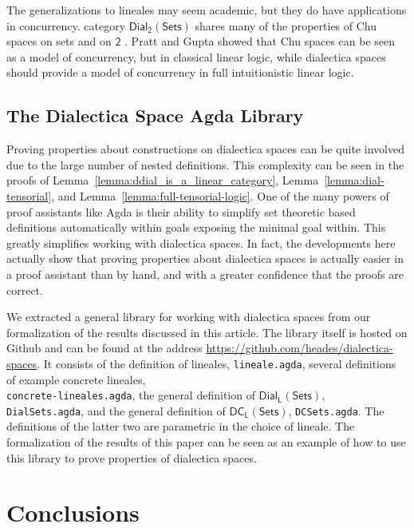 \documentclass[preprint,12pt]{elsarticle}
\newcommand{\dial}[0]{\mathsf{Dial_2}(\mathsf{Sets})}
\newcommand{\dialSets}[1]{\mathsf{Dial_{#1}}(\mathsf{Sets})}
\newcommand{\dcSets}[1]{\mathsf{DC_{#1}}(\mathsf{Sets})}
\begin{document}
The generalizations to lineales may seem academic, but they do have
applications in concurrency.  %
category $\dial$ shares many of the properties of Chu spaces on sets
and on $\mathsf{2}$ \cite{dePaiva:2007}.  Pratt and Gupta
\cite{Gupta:1994} showed that Chu spaces can be seen as a model of
concurrency, but in classical linear logic, while dialectica spaces
should provide a model of concurrency in full intuitionistic linear
logic.

\subsection{The Dialectica Space Agda Library}
\label{subsec:the_dialectica_space_agda_library}
Proving properties about constructions on dialectica spaces can be
quite involved due to the large number of nested definitions.  This
complexity can be seen in the proofs of
Lemma~\ref{lemma:ddial_is_a_linear_category},
Lemma~\ref{lemma:dial-tensorial}, and
Lemma~\ref{lemma:full-tensorial-logic}.  One of the many powers of
proof assistants like Agda is their ability to simplify set theoretic
based definitions automatically within goals exposing the minimal goal
within.  This greatly simplifies working with dialectica spaces.  In
fact, the developments here actually show that proving properties
about dialectica spaces is actually easier in a proof assistant than
by hand, and with a greater confidence that the proofs are correct.

We extracted a general library for working with dialectica spaces from
our formalization of the results discussed in this article. The
library itself is hosted on Github and can be found at the address
\url{https://github.com/heades/dialectica-spaces}.  It consists of the
definition of lineales, \verb!lineale.agda!, several definitions of
example concrete lineales,\\
\verb!concrete-lineales.agda!, the general
definition of $\dialSets{L}$, \\ \verb!DialSets.agda!, and the general
definition of $\dcSets{L}$, \verb!DCSets.agda!. The definitions of the
latter two are parametric in the choice of lineale.  The formalization
of the results of this paper can be seen as an example of how to use
this library to prove properties of dialectica spaces.

\section{Conclusions
}
\label{sec:conclusion_and_future_work}
\end{document}

